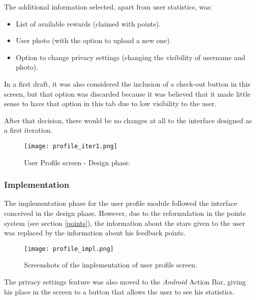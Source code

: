 The additional information selected, apart from user statistics, was:

\begin{itemize}
\item List of available rewards (claimed with points).
\item User photo (with the option to upload a new one).
\item Option to change privacy settings (changing the visibility of username and photo).
\end{itemize}

In a first draft, it was also considered the inclusion of a check-out button in this screen, but that option was discarded because it was believed that it made little sense to have that option in this tab due to low visibility to the user.

After that decision, there would be no changes at all to the interface designed as a first iteration.

\begin{figure}[h!]
  \begin{center}
    \leavevmode
    \texttt{[image: profile\_iter1.png]}
    \caption{User Profile screen - Design phase.}
    \label{fig:profile_iter1}
  \end{center}
\end{figure}

\subsubsection{Implementation}

The implementation phase for the user profile module followed the interface conceived in the design phase. However, due to the reformulation in the points system (see section \ref{points}), the information about the stars given to the user was replaced by the information about his feedback points.

\begin{figure}[h!]
  \begin{center}
    \leavevmode
    \texttt{[image: profile\_impl.png]}
    \caption{Screenshots of the implementation of user profile screen.}
    \label{fig:profile_impl}
  \end{center}
\end{figure}

The privacy settings feature was also moved to the \emph{Android} Action Bar, giving his place in the screen to a button that allows the user to see his statistics.

